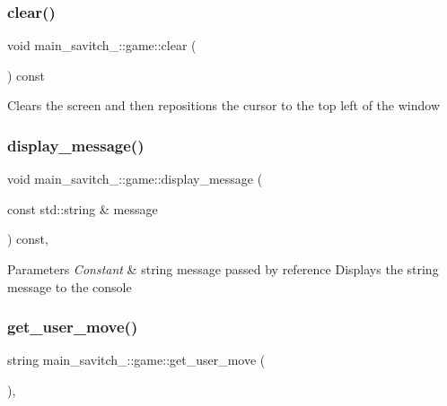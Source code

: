 \subsubsection{\texorpdfstring{clear()}{clear()}}
{\footnotesize\ttfamily void main\+\_\+savitch\+\_\+::game\+::clear (\begin{DoxyParamCaption}{ }\end{DoxyParamCaption}) const}

Clears the screen and then repositions the cursor to the top left of the window \mbox{\label{classmain__savitch__14_1_1game_ac58bfc07db8e604b07d2039b2cf7ab51}} 
\subsubsection{\texorpdfstring{display\+\_\+message()}{display\_message()}}
{\footnotesize\ttfamily void main\+\_\+savitch\+\_\+::game\+::display\+\_\+message (\begin{DoxyParamCaption}\item[{const std\+::string \&}]{message }\end{DoxyParamCaption}) const\hspace{0.3cm}{\ttfamily [protected]}, {\ttfamily [virtual]}}


\begin{DoxyParams}{Parameters}
{\em Constant} & string message passed by reference Displays the string message to the console \\
\hline
\end{DoxyParams}
\mbox{\label{classmain__savitch__14_1_1game_af389f976b7a6c75e096990a09fac94ba}} 
\subsubsection{\texorpdfstring{get\+\_\+user\+\_\+move()}{get\_user\_move()}}
{\footnotesize\ttfamily string main\+\_\+savitch\+\_\+::game\+::get\+\_\+user\+\_\+move (\begin{DoxyParamCaption}{ }\end{DoxyParamCaption})\hspace{0.3cm}{\ttfamily [protected]}, {\ttfamily [virtual]}}

